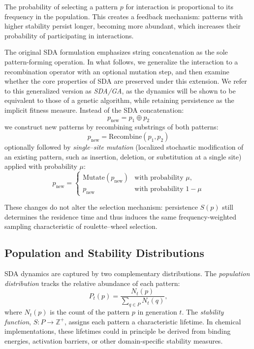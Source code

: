 \documentclass{artificial-life}
\begin{document}
The probability of selecting a pattern $p$ for interaction is proportional to its frequency in the population. This creates a feedback mechanism: patterns with higher stability persist longer, becoming more abundant, which increases their probability of participating in interactions.

The original SDA formulation emphasizes string concatenation as the sole
pattern-forming operation. In what follows, we generalize the interaction 
to a recombination operator with an optional mutation step, and then examine 
whether the core properties of SDA are preserved under this extension. 
We refer to this generalized version as \textit{SDA/GA}, as the dynamics will be shown to 
be equivalent to those of a genetic algorithm, while retaining 
persistence as the implicit fitness measure. Instead of the SDA concatenation:
\[
p_{\text{new}} = p_1 \oplus p_2
\]
we construct new patterns by recombining substrings of both patterns:
\[
p_{\text{new}} = \mathrm{Recombine}(p_1, p_2)
\]
optionally followed by \emph{single–site mutation} (localized stochastic modification of an existing pattern, such as insertion, deletion, or substitution at a single site) applied with probability $\mu$:
\[
p_{\text{new}} =
\begin{cases}
\mathrm{Mutate}(p_{\text{new}}) & \text{with probability } \mu,\\
p_{\text{new}} & \text{with probability } 1-\mu
\end{cases}
\]

These changes do not alter the selection mechanism: persistence $S(p)$ still 
determines the residence time and thus induces the same frequency-weighted sampling characteristic of roulette–wheel selection.

\subsection{Population and Stability Distributions}

SDA dynamics are captured by two complementary distributions. 
The \textit{population distribution} tracks the relative abundance of each pattern:
\begin{equation}
P_t(p) = \frac{N_t(p)}{\sum_{q \in P} N_t(q)},
\end{equation}
where $N_t(p)$ is the count of the pattern $p$ in generation $t$. 
The \textit{stability function}, $S: P \rightarrow \mathbb{Z}^+$, assigns each pattern a characteristic lifetime. 
In chemical implementations, these lifetimes could in principle be derived from binding energies, activation barriers, or other domain-specific stability measures.
\end{document}
